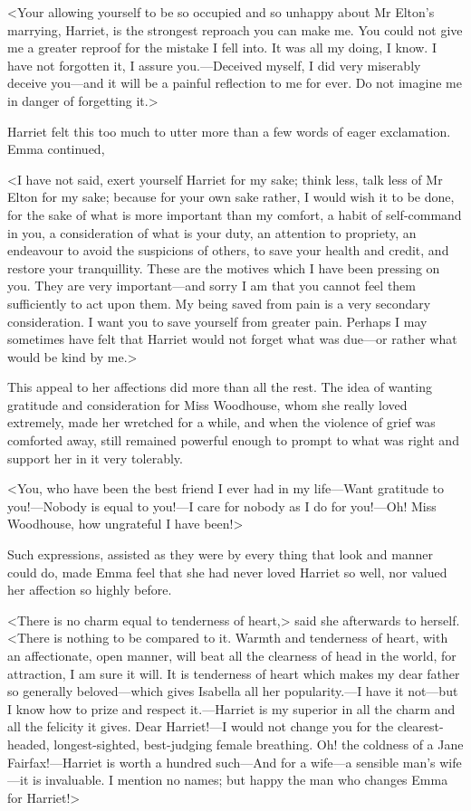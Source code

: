 <Your allowing yourself to be so occupied and so unhappy about Mr Elton's marrying, Harriet, is the strongest reproach you can make me. You could not give me a greater reproof for the mistake I fell into. It was all my doing, I know. I have not forgotten it, I assure you.—Deceived myself, I did very miserably deceive you—and it will be a painful reflection to me for ever. Do not imagine me in danger of forgetting it.>

Harriet felt this too much to utter more than a few words of eager exclamation. Emma continued,

<I have not said, exert yourself Harriet for my sake; think less, talk less of Mr Elton for my sake; because for your own sake rather, I would wish it to be done, for the sake of what is more important than my comfort, a habit of self-command in you, a consideration of what is your duty, an attention to propriety, an endeavour to avoid the suspicions of others, to save your health and credit, and restore your tranquillity. These are the motives which I have been pressing on you. They are very important—and sorry I am that you cannot feel them sufficiently to act upon them. My being saved from pain is a very secondary consideration. I want you to save yourself from greater pain. Perhaps I may sometimes have felt that Harriet would not forget what was due—or rather what would be kind by me.>

This appeal to her affections did more than all the rest. The idea of wanting gratitude and consideration for Miss Woodhouse, whom she really loved extremely, made her wretched for a while, and when the violence of grief was comforted away, still remained powerful enough to prompt to what was right and support her in it very tolerably.

<You, who have been the best friend I ever had in my life—Want gratitude to you!—Nobody is equal to you!—I care for nobody as I do for you!—Oh! Miss Woodhouse, how ungrateful I have been!>

Such expressions, assisted as they were by every thing that look and manner could do, made Emma feel that she had never loved Harriet so well, nor valued her affection so highly before.

<There is no charm equal to tenderness of heart,> said she afterwards to herself. <There is nothing to be compared to it. Warmth and tenderness of heart, with an affectionate, open manner, will beat all the clearness of head in the world, for attraction, I am sure it will. It is tenderness of heart which makes my dear father so generally beloved—which gives Isabella all her popularity.—I have it not—but I know how to prize and respect it.—Harriet is my superior in all the charm and all the felicity it gives. Dear Harriet!—I would not change you for the clearest-headed, longest-sighted, best-judging female breathing. Oh! the coldness of a Jane Fairfax!—Harriet is worth a hundred such—And for a wife—a sensible man's wife—it is invaluable. I mention no names; but happy the man who changes Emma for Harriet!>